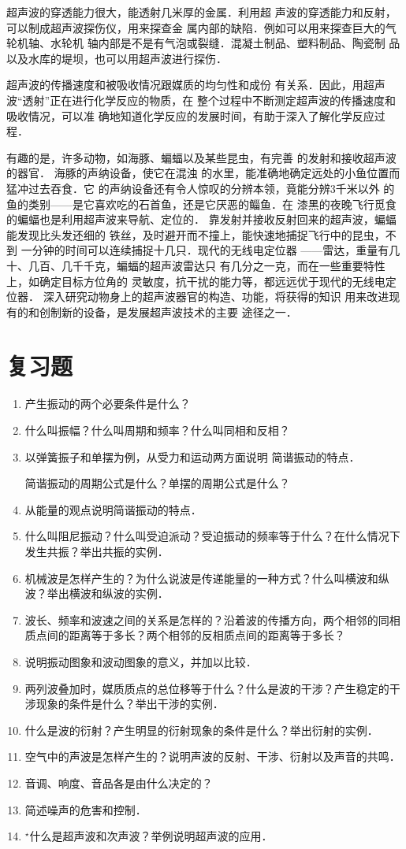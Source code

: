 超声波的穿透能力很大，能透射几米厚的金属．利用超
声波的穿透能力和反射，可以制成超声波探伤仪，用来探查金
属内部的缺陷．例如可以用来探查巨大的气轮机轴、水轮机
轴内部是不是有气泡或裂缝．混凝土制品、塑料制品、陶瓷制
品以及水库的堤坝，也可以用超声波进行探伤．

超声波的传播速度和被吸收情况跟媒质的均匀性和成份
有关系．因此，用超声波“透射”正在进行化学反应的物质，在
整个过程中不断测定超声波的传播速度和吸收情况，可以准
确地知道化学反应的发展时间，有助于深入了解化学反应过
程．

有趣的是，许多动物，如海豚、蝙蝠以及某些昆虫，有完善
的发射和接收超声波的器官．
海豚的声纳设备，使它在混浊
的水里，能准确地确定远处的小鱼位置而猛冲过去吞食．它
的声纳设备还有令人惊叹的分辨本领，竟能分辨3千米以外
的鱼的类别——是它喜欢吃的石首鱼，还是它厌恶的鲻鱼．在
漆黑的夜晚飞行觅食的蝙蝠也是利用超声波来导航、定位的．
靠发射并接收反射回来的超声波，蝙蝠能发现比头发还细的
铁丝，及时避开而不撞上，能快速地捕捉飞行中的昆虫，不到
一分钟的时间可以连续捕捉十几只．现代的无线电定位器
——雷达，重量有几十、几百、几千千克，蝙蝠的超声波雷达只
有几分之一克，而在一些重要特性上，如确定目标方位角的
灵敏度，抗干扰的能力等，都远远优于现代的无线电定位器．
深入研究动物身上的超声波器官的构造、功能，将获得的知识
用来改进现有的和创制新的设备，是发展超声波技术的主要
途径之一．

\section*{复习题}
\begin{enumerate}
    \item 产生振动的两个必要条件是什么？
    \item 什么叫振幅？什么叫周期和频率？什么叫同相和反相？
    \item 以弹簧振子和单摆为例，从受力和运动两方面说明
简谐振动的特点．

简谐振动的周期公式是什么？单摆的周期公式是什么？

\item 从能量的观点说明简谐振动的特点．
\item 什么叫阻尼振动？什么叫受迫派动？受迫振动的频率等于什么？在什么情况下发生共振？举出共振的实例．
\item 机械波是怎样产生的？为什么说波是传递能量的一种方式？什么叫横波和纵波？举出横波和纵波的实例．
\item 波长、频率和波速之间的关系是怎样的？沿着波的传播方向，两个相邻的同相质点间的距离等于多长？两个相邻的反相质点间的距离等于多长？
\item 说明振动图象和波动图象的意义，并加以比较．
\item 两列波叠加时，媒质质点的总位移等于什么？什么是波的干涉？产生稳定的干涉现象的条件是什么？举出干涉的实例．
\item 什么是波的衍射？产生明显的衍射现象的条件是什么？举出衍射的实例．
\item 空气中的声波是怎样产生的？说明声波的反射、干涉、衍射以及声音的共鸣．
\item 音调、响度、音品各是由什么决定的？
\item 简述噪声的危害和控制．
\item $^\star $什么是超声波和次声波？举例说明超声波的应用．
\end{enumerate}


